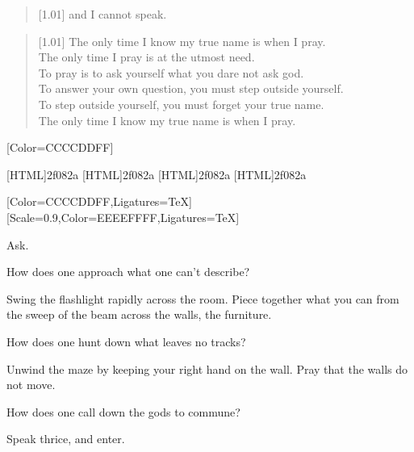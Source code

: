 \begin{paracol}{2}
\begin{verse}[1.01\textwidth]
{    and I cannot speak.}
\end{verse}
\vfill
\newpage

\null
\vfill
\begin{verse}[1.01\textwidth]
    The only time I know my true name is when I pray.\\
    The only time I pray is at the utmost need.\\
    To pray is to ask yourself what you dare not ask god.\\
    To answer your own question, you must step outside yourself.\\
    To step outside yourself, you must forget your true name.\\
    The only time I know my true name is when I pray.
\end{verse}
\vfill
\flushpage
\end{paracol}


\renewfontfamily{}[Color=CCCCDDFF]

[HTML]{2f082a}
[HTML]{2f082a}
[HTML]{2f082a}
[HTML]{2f082a}

\begin{paracol}{2}
  \begin{leftcolumn}


    [Color=CCCCDDFF,Ligatures=TeX]
    \renewfontfamily{}[Scale=0.9,Color=EEEEFFFF,Ligatures=TeX]

\null
\vfill
\begin{ally}
Ask.
\end{ally}
\vfill
\newpage

\noindent How does one approach what one can't describe?

\begin{ally}
Swing the flashlight rapidly across the room. Piece together what you can from the sweep of the beam across the walls, the furniture.
\end{ally}
\noindent How does one hunt down what leaves no tracks?

\begin{ally}
Unwind the maze by keeping your right hand on the wall. Pray that the walls do not move.
\end{ally}
\noindent How does one call down the gods to commune?

\begin{ally}
Speak thrice, and enter.
\end{ally}
\newpage
\end{leftcolumn}
\end{paracol}

